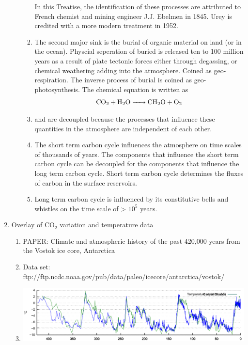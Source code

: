 \documentclass[final,10pt,reqno,twoside]{article}
\begin{document}
\begin{enumerate}[leftmargin=0cm, align=left]
\begin{enumerate}[label=\textbf{(\alph*})]
\begin{enumerate}
         		   In this Treatise, the identification of these processes are attributed to French chemist and mining engineer J.J. Ebelmen in 1845. Urey is credited with a more modern treatment in 1952.
         		\item The second major  sink is the burial of organic material on land (or in the ocean). Physcial seperation of buried  is released ten to 100 million years as a result of plate tectonic forces either through degassing, or chemical weathering adding  into the atmosphere. Coined as geo-respiration. The inverse process of burial is coined as geo-photosynthesis. The chemical equation is written as
         		    \begin{equation}
         		    	\ce{CO2 + H2O -> CH2O + O2}
         		    \end{equation}
         		\item {} and  are decoupled because the processes that influence these quantities in the atmosphere are independent of each other.
         		\item The short term carbon cycle influences the atmosphere on time scales of thousands of years. The components that influence the short term carbon cycle can be decoupled for the components that influence the long term carbon cycle. Short term carbon cycle determines the fluxes of carbon in the surface reservoirs.  
         		\item Long term carbon cycle is influenced by its constitutive bells and whistles on the time scale of > $10^5$ years.   
         	\end{enumerate}
         \end{enumerate}    
         \item Overlay of CO$_2$ variation and temperature data
            \begin{enumerate}[label=\textbf{(\alph*})]
            	\item PAPER: Climate and atmospheric history of the past 420,000 years from the Vostok ice core, Antarctica
            	\item Data set: ftp://ftp.ncdc.noaa.gov/pub/data/paleo/icecore/antarctica/vostok/
            	\item 
            	   \includegraphics{00FIGURES/Temperature_variation_and_CO2.png}
            \end{enumerate}
              
 \end{enumerate}

  
%  
%  
\end{document}

